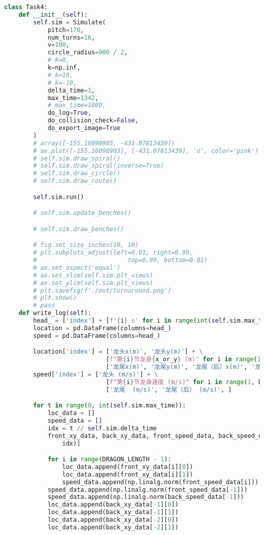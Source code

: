 \begin{lstlisting}[language=python]
class Task4:
    def __init__(self):
        self.sim = Simulate(
            pitch=170,
            num_turns=16,
            v=100,
            circle_radius=900 / 2,
            # k=0,
            k=np.inf,
            # k=10,
            # k=-10,
            delta_time=1,
            max_time=1342,
            # max_time=1000,
            do_log=True,
            do_collision_check=False,
            do_export_image=True
        )
        # array([-155.16098903, -431.07813439])
        # ax.plot([-155.16098903], [-431.07813439], 'o', color='pink')
        # self.sim.draw_spiral()
        # self.sim.draw_spiral(inverse=True)
        # self.sim.draw_circle()
        # self.sim.draw_route()

        self.sim.run()

        # self.sim.update_benches()

        # self.sim.draw_benches()

        # fig.set_size_inches(10, 10)
        # plt.subplots_adjust(left=0.01, right=0.99,
        #                         top=0.99, bottom=0.01)
        # ax.set_aspect('equal')
        # ax.set_xlim(self.sim.plt_views)
        # ax.set_ylim(self.sim.plt_views)
        # plt.savefig(f'./out/turnaround.png')
        # plt.show()
        # pass
    def write_log(self):
        head_ = ['index'] + [f'{i} s' for i in range(int(self.sim.max_time))]
        location = pd.DataFrame(columns=head_)
        speed = pd.DataFrame(columns=head_)

        location['index'] = ['龙头x(m)', '龙头y(m)'] + \
                            [f"第{i}节龙身{x_or_y} (m)" for i in range(1, DRAGON_LENGTH - 1) for x_or_y in ['x', 'y']] + \
                            ['龙尾x(m)', '龙尾y(m)', '龙尾（后）x(m)', '龙尾（后）y(m)', ]
        speed['index'] = ['龙头 (m/s)'] + \
                            [f"第{i}节龙身速度 (m/s)" for i in range(1, DRAGON_LENGTH - 1)] + \
                            ['龙尾  (m/s)', '龙尾（后） (m/s)', ]

        for t in range(0, int(self.sim.max_time)):
            loc_data = []
            speed_data = []
            idx = t // self.sim.delta_time
            front_xy_data, back_xy_data, front_speed_data, back_speed_data = self.sim.log[int(
                idx)]

            for i in range(DRAGON_LENGTH - 1):
                loc_data.append(front_xy_data[i][0])
                loc_data.append(front_xy_data[i][1])
                speed_data.append(np.linalg.norm(front_speed_data[i]))
            speed_data.append(np.linalg.norm(front_speed_data[-1]))
            speed_data.append(np.linalg.norm(back_speed_data[-1]))
            loc_data.append(back_xy_data[-1][0])
            loc_data.append(back_xy_data[-1][1])
            loc_data.append(back_xy_data[-2][0])
            loc_data.append(back_xy_data[-2][1])


\end{lstlisting}
